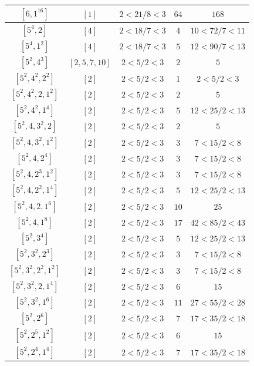 \documentclass{article}%
\begin{document}
\begin{center}
\begin{longtable}{||c|c|c|c|c||}
$[6, 1^{16}]$ & $[1]$ & $2 < 21/8 < 3$ & $64$ & $168$ \\ \hline 
$[5^{4}, 2]$ & $[4]$ & $2 < 18/7 < 3$ & $4$ & $10 < 72/7 < 11$ \\ \hline 
$[5^{4}, 1^{2}]$ & $[4]$ & $2 < 18/7 < 3$ & $5$ & $12 < 90/7 < 13$ \\ \hline 
$[5^{2}, 4^{3}]$ & $[2, 5, 7, 10]$ & $2 < 5/2 < 3$ & $2$ & $5$ \\ \hline 
$[5^{2}, 4^{2}, 2^{2}]$ & $[2]$ & $2 < 5/2 < 3$ & $1$ & $2 < 5/2 < 3$ \\ \hline 
$[5^{2}, 4^{2}, 2, 1^{2}]$ & $[2]$ & $2 < 5/2 < 3$ & $2$ & $5$ \\ \hline 
$[5^{2}, 4^{2}, 1^{4}]$ & $[2]$ & $2 < 5/2 < 3$ & $5$ & $12 < 25/2 < 13$ \\ \hline 
$[5^{2}, 4, 3^{2}, 2]$ & $[2]$ & $2 < 5/2 < 3$ & $2$ & $5$ \\ \hline 
$[5^{2}, 4, 3^{2}, 1^{2}]$ & $[2]$ & $2 < 5/2 < 3$ & $3$ & $7 < 15/2 < 8$ \\ \hline 
$[5^{2}, 4, 2^{4}]$ & $[2]$ & $2 < 5/2 < 3$ & $3$ & $7 < 15/2 < 8$ \\ \hline 
$[5^{2}, 4, 2^{3}, 1^{2}]$ & $[2]$ & $2 < 5/2 < 3$ & $3$ & $7 < 15/2 < 8$ \\ \hline 
$[5^{2}, 4, 2^{2}, 1^{4}]$ & $[2]$ & $2 < 5/2 < 3$ & $5$ & $12 < 25/2 < 13$ \\ \hline 
$[5^{2}, 4, 2, 1^{6}]$ & $[2]$ & $2 < 5/2 < 3$ & $10$ & $25$ \\ \hline 
$[5^{2}, 4, 1^{8}]$ & $[2]$ & $2 < 5/2 < 3$ & $17$ & $42 < 85/2 < 43$ \\ \hline 
$[5^{2}, 3^{4}]$ & $[2]$ & $2 < 5/2 < 3$ & $5$ & $12 < 25/2 < 13$ \\ \hline 
$[5^{2}, 3^{2}, 2^{3}]$ & $[2]$ & $2 < 5/2 < 3$ & $3$ & $7 < 15/2 < 8$ \\ \hline 
$[5^{2}, 3^{2}, 2^{2}, 1^{2}]$ & $[2]$ & $2 < 5/2 < 3$ & $3$ & $7 < 15/2 < 8$ \\ \hline 
$[5^{2}, 3^{2}, 2, 1^{4}]$ & $[2]$ & $2 < 5/2 < 3$ & $6$ & $15$ \\ \hline 
$[5^{2}, 3^{2}, 1^{6}]$ & $[2]$ & $2 < 5/2 < 3$ & $11$ & $27 < 55/2 < 28$ \\ \hline 
$[5^{2}, 2^{6}]$ & $[2]$ & $2 < 5/2 < 3$ & $7$ & $17 < 35/2 < 18$ \\ \hline 
$[5^{2}, 2^{5}, 1^{2}]$ & $[2]$ & $2 < 5/2 < 3$ & $6$ & $15$ \\ \hline 
$[5^{2}, 2^{4}, 1^{4}]$ & $[2]$ & $2 < 5/2 < 3$ & $7$ & $17 < 35/2 < 18$ \\ \hline 

\end{longtable}
\end{center}
\end{document}
